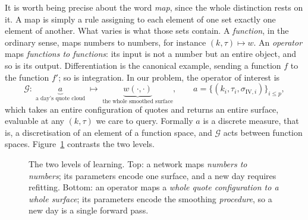 It is worth being precise about the word \emph{map}, since the whole distinction rests on it. A
map is simply a rule assigning to each element of one set exactly one element of another. What
varies is what those sets contain. A \emph{function}, in the ordinary sense, maps numbers to
numbers, for instance $(k,\tau)\mapsto w$. An \emph{operator} maps \emph{functions to functions}:
its input is not a number but an entire object, and so is its output. Differentiation is the
canonical example, sending a function $f$ to the function $f'$; so is integration. In our
problem, the operator of interest is
\begin{equation}\label{eq:opmap}
\mathcal G:\;\underbrace{a}_{\text{a day's quote cloud}}\;\longmapsto\;
\underbrace{w(\cdot,\cdot)}_{\text{the whole smoothed surface}},
\qquad
a=\bigl\{(k_i,\tau_i,\sigma_{\mathrm{IV},i})\bigr\}_{i\le p},
\end{equation}
which takes an entire configuration of quotes and returns an entire surface, evaluable at any
$(k,\tau)$ we care to query. Formally $a$ is a discrete measure, that is, a discretisation of an
element of a function space, and $\mathcal G$ acts between function spaces. Figure~\ref{fig:funcvsop}
contrasts the two levels.

\begin{figure}[htbp]\centering
{}
\caption{The two levels of learning. Top: a network maps \emph{numbers to numbers}; its
parameters encode one surface, and a new day requires refitting. Bottom: an operator maps a
\emph{whole quote configuration to a whole surface}; its parameters encode the smoothing
\emph{procedure}, so a new day is a single forward pass.}\label{fig:funcvsop}
\end{figure}

